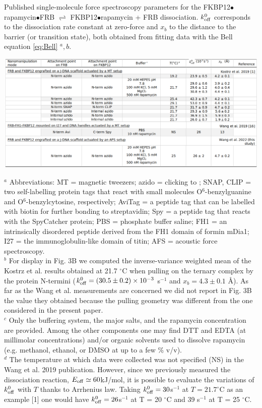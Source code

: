 \documentclass{biophys-new}
\begin{document}
\newpage

\begin{table}[hbt!]  %
	\caption{Published single-molecule force spectroscopy parameters for the FKBP12$\bullet$rapamycin$\bullet$FRB   $\rightleftharpoons$  FKBP12$\bullet$rapamycin + FRB dissociation. $k^0_{\rm off}$ corresponds to the dissociation rate constant at zero-force and $x_b$ to the distance to the barrier (or transition state), both obtained from fitting data with the Bell equation \ref{eq:Bell} $^a,b$.}
	\label{tbl:s4}
	\includegraphics[width=\linewidth]{Figures/TableS4.png}
\end{table}
\noindent
$^a$ Abbreviations: MT = magnetic tweezers; azido = clicking to  ; SNAP, CLIP = two self-labelling protein tags that react with small molecules O$^6$-benzylguanine and O$^6$-benzylcytosine, respectively; AviTag = a peptide tag that can be labelled with biotin for further bonding to streptavidin; Spy = a peptide tag that reacts with the SpyCatcher protein; PBS = phosphate buffer saline; FH1 = an intrinsically disordered peptide derived from the FH1 domain of formin mDia1; I27 = the immunoglobulin-like domain of titin; AFS = acoustic force spectroscopy.\\
$^b$ For display in Fig. 3B we computed the inverse-variance weighted mean of the Kostrz et al. results obtained at 21.7 $^{\circ}$C when pulling on the ternary complex by the protein N-termini ($k^0_{\rm off} = (30.5 \pm 0.2) \times 10^{-3}$ s$^{-1}$ and $x_b = 4.3 \pm 0.1 $ \r{A}). As far as the Wang et al. measurements are concerned we did not report in Fig. 3B the  value they obtained because the pulling geometry was different from the one considered in the present paper.\\
$^c$ Only the buffering system, the major salts, and the rapamycin concentration are provided. Among the other components one may find DTT and EDTA (at millimolar concentrations) and/or organic solvents used to dissolve rapamycin (e.g. methanol, ethanol, or DMSO at up to a few \% v/v).\\
$^d$ The temperature at which data were collected was not specified (NS) in the Wang et al. 2019 publication. However, since we previously measured the dissociation reaction, $E_{\rm off} \simeq 60$kJ/mol, it is possible to evaluate the variations of $k^0_{\rm off}$ with $T$ thanks to Arrhenius law. Taking  $k^0_{\rm off} = 30 $s$^{-1}$ at $T = 21.7 ^{\circ}$C as an example [1] one would have $k^0_{\rm off} = 26 $s$^{-1}$ at T = 20 $^{\circ}$C and 39 s$^{-1}$ at T = 25 $^{\circ}$C.\\
\end{document}
